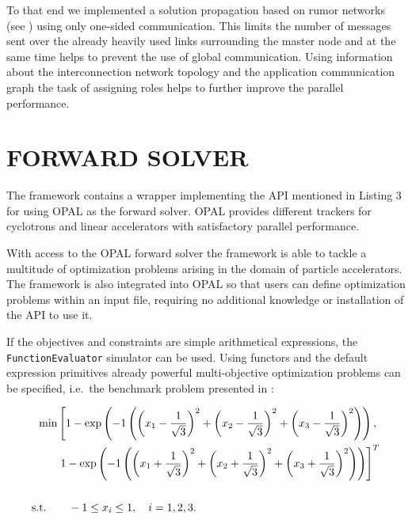 \documentclass[preprint,linenumbers,amsmath,amssymb,aps,prstab]{revtex4-1}%
\begin{document}
To that end we implemented a solution propagation based on rumor networks 
(see \cite{bgps:06,ayss:09}) using only one-sided communication.
This limits the number of messages sent over the already heavily used links
  surrounding the master node and at the same time helps to prevent the use of
  global communication.
Using information about the interconnection network topology and the
  application communication graph the task of assigning roles helps to further
  improve the parallel performance.



\section{FORWARD SOLVER} \label{sec:forward-solver}

The framework contains a wrapper implementing the API mentioned in
  Listing 3 for using \textsc{OPAL} \cite{opal} as the forward solver.
\textsc{OPAL} provides different trackers for cyclotrons and linear
  accelerators with satisfactory parallel performance. 

With access to the \textsc{OPAL} forward solver the framework is able to
  tackle a multitude of optimization problems arising in the domain of
  particle accelerators.
  The framework is also integrated into \textsc{OPAL} so that users can 
  define optimization problems within an input file, requiring no 
  additional knowledge or installation of the API to use it.


If the objectives and constraints are simple arithmetical expressions, the
  \texttt{FunctionEvaluator} simulator can be used.
Using functors and the default expression primitives already powerful
  multi-objective optimization problems can be specified, i.e.\ the benchmark
  problem presented in \cite{hbwh:05}:
%

	\begin{widetext}
		\begin{align} \label{eqn:bench}
		\text{min} & \left[ 1 - \exp \left( -1 \left(
		\left(x_1 - \frac{1}{\sqrt{3}} \right)^2 +
		\left(x_2 - \frac{1}{\sqrt{3}} \right)^2 +
		\left(x_3 - \frac{1}{\sqrt{3}} \right)^2 \right)\right), \right. \\
		\vspace{3em} 
		& \left. 1 - \exp \left( -1 \left(
		\left(x_1 + \frac{1}{\sqrt{3}} \right)^2 +
		\left(x_2 + \frac{1}{\sqrt{3}} \right)^2 +
		\left(x_3 + \frac{1}{\sqrt{3}} \right)^2 \right)\right) \right]^T \nonumber \\
		\vspace{3em} \nonumber \\
		\text{s.t.} \quad & \quad -1 \le x_i \le 1, \quad i=1,2,3 \nonumber
		\text{.} \nonumber
		\end{align}
	\end{widetext}
\end{document}
